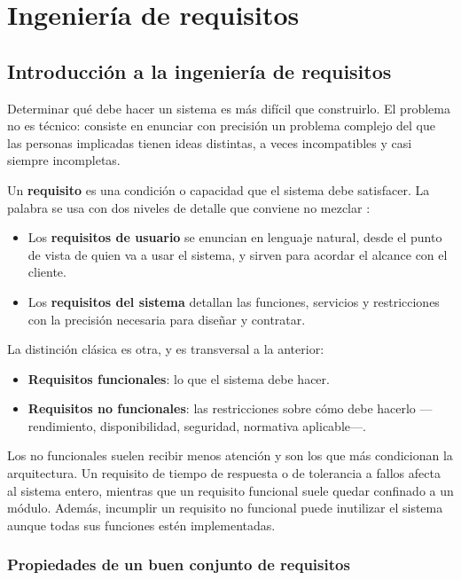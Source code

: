 \chapter{Ingeniería de requisitos}

\section{Introducción a la ingeniería de requisitos}

Determinar qué debe hacer un sistema es más difícil que construirlo. El problema
no es técnico: consiste en enunciar con precisión un problema complejo del que
las personas implicadas tienen ideas distintas, a veces incompatibles y casi
siempre incompletas.

Un \textbf{requisito} es una condición o capacidad que el sistema debe satisfacer.
La palabra se usa con dos niveles de detalle que conviene no mezclar
\cite{sommerville2016}:

\begin{itemize}
    \item Los \textbf{requisitos de usuario} se enuncian en lenguaje natural,
          desde el punto de vista de quien va a usar el sistema, y sirven para
          acordar el alcance con el cliente.
    \item Los \textbf{requisitos del sistema} detallan las funciones, servicios y
          restricciones con la precisión necesaria para diseñar y contratar.
\end{itemize}

La distinción clásica es otra, y es transversal a la anterior:

\begin{itemize}
    \item \textbf{Requisitos funcionales}: lo que el sistema debe hacer.
    \item \textbf{Requisitos no funcionales}: las restricciones sobre cómo debe
          hacerlo —rendimiento, disponibilidad, seguridad, normativa aplicable—.
\end{itemize}

Los no funcionales suelen recibir menos atención y son los que más condicionan la
arquitectura. Un requisito de tiempo de respuesta o de tolerancia a fallos afecta
al sistema entero, mientras que un requisito funcional suele quedar confinado a
un módulo. Además, incumplir un requisito no funcional puede inutilizar el sistema
aunque todas sus funciones estén implementadas.

\subsection*{Propiedades de un buen conjunto de requisitos}

